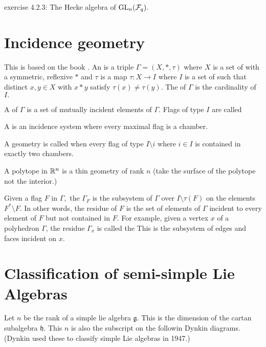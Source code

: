 \documentclass[12pt]{article}
\begin{document}
\cite{Kassel2010}
exercise 4.2.3: The Hecke algebra of $\mathrm{GL}_n(\mathcal{F}_q).$

%
%

\section{Incidence geometry}

This is based on the book \cite{Buekenhout2013}.
An  is a triple 
$\Gamma=(X,*,\tau)$ where $X$ is a set of 
with a symmetric, reflexive  $*$
and $\tau$ is a map $\tau:X\to I$ where $I$ is a set of 
such that distinct $x,y\in X$ with $x*y$ satisfy $\tau(x)\ne\tau(y).$
The  of $\Gamma$ is the cardinality of $I.$

A  of $\Gamma$ is a set of mutually incident
elements of $\Gamma.$
Flags of type $I$ are called 

A  is an incidence system where every
maximal flag is a chamber.

A geometry is called  when every
flag of type $I\setminus {i}$ where $i\in I$
is contained in exactly two chambers.

A polytope in $\mathbb{R}^n$ is a thin geometry of rank $n$
(take the surface of the polytope not the interior.)

Given a flag $F$ in $\Gamma,$
the  $\Gamma_F$ is the 
subsystem of $\Gamma$ over $I\setminus \tau(F) $
on the elements $F^{*}\setminus F.$
In other words, the residue of $F$ is the set of
elements of $\Gamma$ incident to every element of $F$
but not contained in $F.$
For example, given a vertex $x$ of a polyhedron $\Gamma$, the
residue $\Gamma_x$ is called the  
This is the subsystem of edges and faces incident on $x.$

% 


\section{Classification of semi-simple Lie Algebras}

Let $n$ be the rank of a simple lie algebra $\mathfrak{g}.$
This is the dimension of the cartan subalgebra $\mathfrak{h}.$
This $n$ is also the subscript on the followin Dynkin diagrams. 
(Dynkin used these to classify simple Lie algebras in 1947.)
\end{document}

